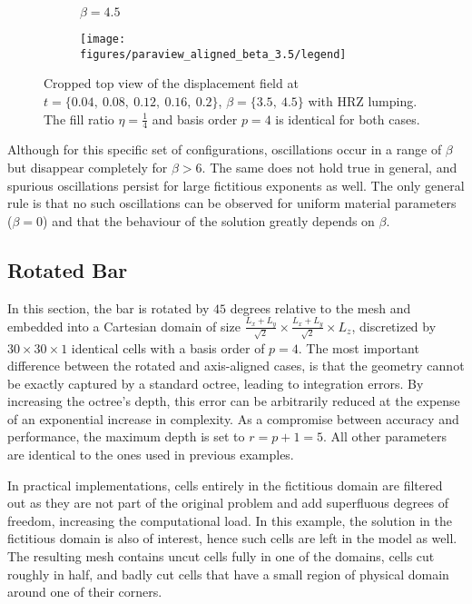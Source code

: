 \begin{figure}[!h]
\begin{subfigure}[b]{0.45\textwidth}
		\centering
		\caption{$\beta=4.5$}
	\end{subfigure}
	\begin{subfigure}[b]{0.95\textwidth}
		\centering
		\texttt{[image: figures/paraview\_aligned\_beta\_3.5/legend]}
	\end{subfigure}
	\caption{Cropped top view of the displacement field at $t=\{0.04, \ 0.08, \ 0.12, \ 0.16, \ 0.2\}$, $\beta = \{3.5, \ 4.5\}$ with HRZ lumping. The fill ratio $\eta=\frac{1}{4}$ and basis order $p=4$ is identical for both cases.}
	\label{fig:hrz_displacement_field_beta}
\end{figure}

Although for this specific set of configurations, oscillations occur in a range of $\beta$ but disappear completely for $\beta > 6$. The same does not hold true in general, and spurious oscillations persist for large fictitious exponents as well. The only general rule is that no such oscillations can be observed for uniform material parameters ($\beta=0$) and that the behaviour of the solution greatly depends on $\beta$.

%
\subsection{Rotated Bar}
\label{section:rotated_bar}
%

In this section, the bar is rotated by $45$ degrees relative to the mesh and embedded into a Cartesian domain of size $\frac{L_x + L_y}{\sqrt{2}} \times \frac{L_x + L_y}{\sqrt{2}} \times L_z$, discretized by $30 \times 30 \times 1$ identical cells with a basis order of $p=4$.
The most important difference between the rotated and axis-aligned cases, is that the geometry cannot be exactly captured by a standard octree, leading to integration errors. By increasing the octree's depth, this error can be arbitrarily reduced at the expense of an exponential increase in complexity. As a compromise between accuracy and performance, the maximum depth is set to $r=p+1=5$.
All other parameters are identical to the ones used in previous examples.

In practical implementations, cells entirely in the fictitious domain are filtered out as they are not part of the original problem and add superfluous degrees of freedom, increasing the computational load. In this example, the solution in the fictitious domain is also of interest, hence such cells are left in the model as well. The resulting mesh contains uncut cells fully in one of the domains, cells cut roughly in half, and badly cut cells that have a small region of physical domain around one of their corners.

